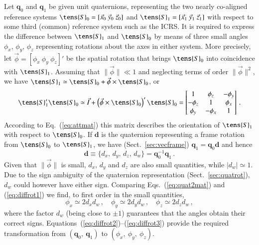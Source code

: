 \documentclass[structabstract]{aa}
\newcommand{\quat}[1]{\mathbf{#1}}
\begin{document}
Let $\quat{q}_0$ and $\quat{q}_1$ be given unit quaternions, representing the two 
nearly co-aligned reference systems $\tens{S}_0=[\vec{x}_0~\vec{y}_0~\vec{z}_0]$ 
and $\tens{S}_1=[\vec{x}_1~\vec{y}_1~\vec{z}_1]$ with respect to some third 
(common) reference system such as the ICRS.  It is required to express the difference 
between $\tens{S}_1$ and $\tens{S}_0$ by means of three small angles 
$\phi_x$, $\phi_y$, $\phi_z$ representing rotations about the axes in either
system. More precisely, let $\vec{\phi}=[\phi_x~\phi_y~\phi_z]'$ be the spatial 
rotation that brings $\tens{S}_0$ into coincidence with $\tens{S}_1$. Assuming 
that $\|\vec{\phi}\|\ll 1$ and neglecting terms of order $\|\vec{\phi}\|^2$, we have 
$\tens{S}_1\simeq\tens{S}_0+\vec{\phi}\times\tens{S}_0$, or
\begin{equation}\label{eq:diffrot1}
\tens{S}_1'\tens{S}_0 \simeq \vec{I}+\left(\vec{\phi}\times\tens{S}_0\right)'\tens{S}_0
=\begin{bmatrix} 1 & \phi_z & -\phi_y \\ -\phi_z & 1 & \phi_x \\ \phi_y & -\phi_x & 1
\end{bmatrix} \, .
\end{equation}
According to Eq.~(\ref{eq:attmat}) this matrix describes the orientation of $\tens{S}_1$ 
with respect to $\tens{S}_0$. If $\quat{d}$ is the quaternion representing a frame rotation 
from $\tens{S}_0$ to $\tens{S}_1$, we have (Sect.~\ref{sec:vecframe}) 
$\quat{q}_1=\quat{q}_0\quat{d}$ and hence
\begin{equation}\label{eq:diffrot2}
\quat{d} \equiv \{d_x,\, d_y,\, d_z,\, d_w\} = \quat{q}_0^{-1}\quat{q}_1 \, .
\end{equation}
Given that $\|\vec{\phi}\|$ is small, $d_x$, $d_y$ and $d_z$ are also small quantities,
while $|d_w|\simeq 1$. Due to the sign ambiguity of the quaternion representation 
(Sect.~\ref{sec:quatrot}), $d_w$ could however have either sign. Comparing 
Eqs.~(\ref{eq:quat2mat}) and (\ref{eq:diffrot1}) we find, to first order in the small quantities,
\begin{equation}\label{eq:diffrot3}
\phi_x \simeq 2 d_x d_w\, , \quad
\phi_y \simeq 2 d_y d_w\, , \quad
\phi_z \simeq 2 d_z d_w\, ,
\end{equation}
where the factor $d_w$ (being close to $\pm 1$) guarantees that the angles 
obtain their correct signs. Equations~(\ref{eq:diffrot2})--(\ref{eq:diffrot3}) provide 
the required transformation from $(\quat{q}_0,~\quat{q}_1)$ to $(\phi_x,~\phi_y,~\phi_z)$.
\end{document}
